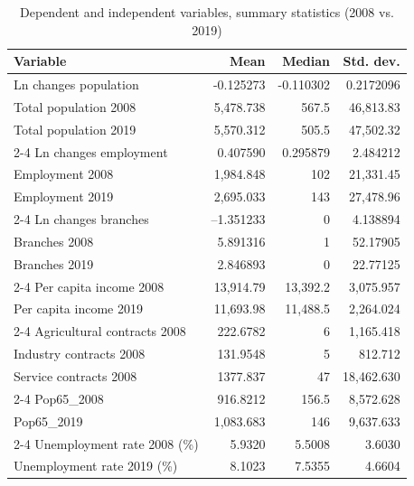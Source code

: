 \documentclass[a4paper,11pt,oneside]{article}
\begin{document}
{\begin{table}
\end{table}

\pagebreak
\clearpage



\begin{table}
\footnotesize
\centering
\caption{Dependent and independent variables, summary statistics (2008 vs. 2019)}
\label{tbl:variables_descriptive}
\begin{tabular}{lrrr}
\toprule
Variable                        & Mean       & Median     & Std. dev. \\
\midrule
Ln changes population         & -0.125273 & -0.110302 & 0.2172096 \\
Total population 2008         & 5,478.738   & 567.5      & 46,813.83  \\
Total population 2019         & 5,570.312   & 505.5      & 47,502.32  \\
\cmidrule(r){2-4}
Ln changes employment         & 0.407590  & 0.295879  & 2.484212  \\
Employment 2008               & 1,984.848   & 102        & 21,331.45  \\
Employment 2019               & 2,695.033   & 143        & 27,478.96  \\
\cmidrule(r){2-4}
Ln changes branches           & --1.351233  & 0          & 4.138894  \\
Branches 2008                 & 5.891316   & 1          & 52.17905  \\
Branches 2019                 & 2.846893   & 0   & 22.77125  \\
\cmidrule(r){2-4}
Per capita income 2008        & 13,914.79   & 13,392.2    & 3,075.957  \\
Per capita income 2019        & 11,693.98   & 11,488.5    & 2,264.024  \\
\cmidrule(r){2-4}
Agricultural contracts  2008  & 222.6782   & 6          & 1,165.418  \\
Industry contracts  2008      & 131.9548   & 5          & 812.712  \\
Service contracts 2008        & 1377.837   & 47         & 18,462.630  \\
\cmidrule(r){2-4}
Pop65\_2008                   & 916.8212   & 156.5      & 8,572.628  \\
Pop65\_2019                   & 1,083.683   & 146        & 9,637.633  \\
\cmidrule(r){2-4}
Unemployment rate 2008 (\%)     & 5.9320  & 5.5008  & 3.6030   \\
Unemployment rate 2019 (\%)     & 8.1023  & 7.5355  & 4.6604 \\
\bottomrule
\end{tabular}%
\end{table}


}
\end{document}

